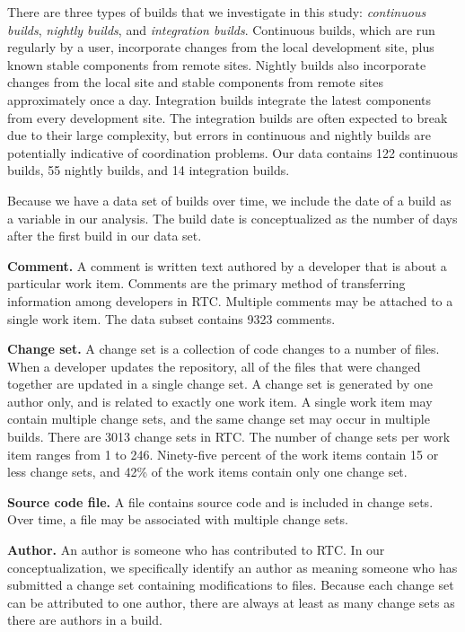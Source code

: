 There are three types of builds that we investigate in this study: \emph{continuous builds}, \emph{nightly builds}, and \emph{integration builds}. Continuous builds, which are run regularly by a user, incorporate changes from the local development site, plus known stable components from remote sites.  Nightly builds also incorporate changes from the local site and stable components from remote sites approximately once a day. Integration builds integrate the latest components from every development site. The integration builds are often expected to break due to their large complexity, but errors in continuous and nightly builds are potentially indicative of coordination problems. Our data contains 122 continuous builds, 55 nightly builds, and 14 integration builds.

Because we have a data set of builds over time, we include the date of a build as a variable in our analysis. The build date is conceptualized as the number of days after the first build in our data set.

\textbf{Comment.} A comment is written text authored by a developer that is about a particular work item. Comments are the primary method of transferring information among developers in RTC. Multiple comments may be attached to a single work item. The data subset contains 9323 comments.

\textbf{Change set.} A change set is a collection of code changes to a number of files. When a developer updates the repository, all of the files that were changed together are updated in a single change set. A change set is generated by one author only, and is related to exactly one work item. A single work item may contain multiple change sets, and the same change set may occur in multiple builds. There are 3013 change sets in RTC. The number of change sets per work item ranges from 1 to 246. Ninety-five percent of the work items contain 15 or less change sets, and 42\% of the work items contain only one change set.

\textbf{Source code file.} A file contains source code and is included in change sets. Over time, a file may be associated with multiple change sets.

\textbf{Author.} An author is someone who has contributed to RTC. In our conceptualization, we specifically identify an author as meaning someone who has submitted a change set containing modifications to files. Because each change set can be attributed to one author, there are always at least as many change sets as there are authors in a build.


